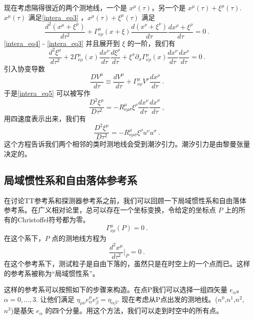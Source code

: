 现在考虑隔得很近的两个测地线，一个是 $x^\mu(\tau)$，另一个是 $x^\mu(\tau)+\xi^\mu(\tau)$. $x^\mu(\tau)$ 满足\autoref{intera_eq3} ，$x^\mu(\tau) + \xi^\mu(\tau)$ 满足
\begin{equation}\label{intera_eq4}
\frac{d^2(x^\mu+\xi^\mu)}{d\tau^2} + \Gamma^\mu_{\nu\rho} (x+\xi) \frac{d(x^\nu+\xi^\nu)}{d\tau} \frac{d x^\rho+\xi^\rho}{d \tau} = 0~.
\end{equation}
\autoref{intera_eq4} - \autoref{intera_eq3} 并且展开到 $\xi$ 的一阶，我们有
\begin{equation}\label{intera_eq5}
\frac{d^2 \xi^\mu}{d \tau^2} + 2 \Gamma^\mu_{\nu\rho} (x) \frac{dx^\nu}{d\tau} \frac{d\xi^\rho}{d\tau} + \xi^\sigma \partial_\sigma \Gamma^\mu_{\nu\rho} (x) \frac{dx^\nu}{d\tau} \frac{dx^\rho}{d\tau} = 0 ~. 
\end{equation}
引入协变导数
\begin{equation}
\frac{D V^\mu}{d\tau} \equiv \frac{d V^\mu}{d\tau} + \Gamma^\mu_{\nu\rho} V^\nu \frac{dx^\rho}{d\tau} ~.
\end{equation}
于是\autoref{intera_eq5} 可以被写作
\begin{equation}
\frac{D^2 \xi^\mu}{D \tau^2} = - R^\mu_{\nu\rho\sigma} \xi^\rho \frac{dx^\nu}{d\tau} \frac{dx^\sigma}{d\tau} ~,
\end{equation}
用四速度表示出来，我们有
\begin{equation}
\frac{D^2 \xi^\mu}{D\tau^2} = - R^\mu_{\nu\rho\sigma} \xi^\rho u^\nu u^\sigma ~. 
\end{equation}
这个方程告诉我们两个相邻的类时测地线会受到潮汐引力。潮汐引力是由黎曼张量决定的。

\subsection{局域惯性系和自由落体参考系}
在讨论TT参考系和探测器参考系之前，我们可以回顾一下局域惯性系和自由落体参考系。在广义相对论里，总可以存在一个坐标变换，令给定的坐标点 $P$ 上的所有的Christoffel符号都为零。
\begin{equation}
\Gamma^\mu_{\nu\rho} (P) = 0 ~.
\end{equation}
在这个系下，$P$ 点的测地线方程为
\begin{equation}
\frac{d^2 x^\mu}{d\tau^2} \bigg|_{P} = 0 ~.
\end{equation}
在这个参考系下，测试粒子是自由下落的，虽然只是在时空上的一个点而已。这样的参考系被称为“局域惯性系”。

这样的参考系可以按照如下的步骤来构造。在点P我们可以选择一组四矢量 $e_\alpha$。$\alpha = 0,\ldots,3$. 让他们满足 $\eta_{\mu\nu}e^\mu_\alpha e^\nu_\beta = \eta_{\alpha\beta}$. 现在考虑从P点出发的测地线。($n^0$,$n^1$,$n^2$,$n^3$)是基矢 $e_\alpha$ 的四个分量。用这个方法，我们可以走到时空中的所有点。

